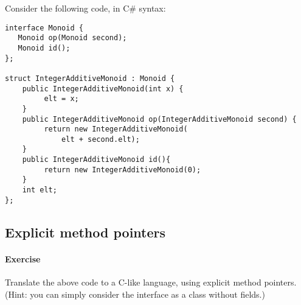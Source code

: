 \documentclass{article}
\newcommand{\percents}[1]{\protect \marginpar[l]{\bf [#1]}}
\newcounter{question}
\newcommand{\question}[1]{
  \addtocounter{question}{1}
  \paragraph{Exercise~\arabic{question}  \percents{#1}}
 }
\begin{document}
Consider the following code, in C\# syntax:
\begin{verbatim}
interface Monoid {
   Monoid op(Monoid second);
   Monoid id();
};

struct IntegerAdditiveMonoid : Monoid {
    public IntegerAdditiveMonoid(int x) {
         elt = x;
    }
    public IntegerAdditiveMonoid op(IntegerAdditiveMonoid second) {
         return new IntegerAdditiveMonoid(
             elt + second.elt);
    }
    public IntegerAdditiveMonoid id(){
         return new IntegerAdditiveMonoid(0);
    }
    int elt;
};

\end{verbatim}
%

\subsection{Explicit method pointers}

\question{*,@2} Translate the above code to a C-like language, using
explicit method pointers. (Hint: you can simply consider the interface
as a class without fields.)
\end{document}
